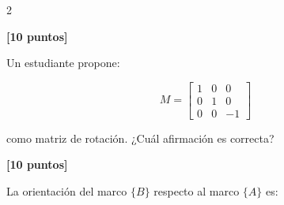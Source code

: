 \documentclass[10pt]{article}
\begin{document}
\begin{multicols}{2}

        \begin{question}
            \textbf{[10 puntos]}

            Un estudiante propone:

            \[
            M=
            \begin{bmatrix}
                1 & 0 & 0\\
                0 & 1 & 0\\
                0 & 0 & -1
            \end{bmatrix}
            \]

            como matriz de rotación.
            \columnbreak
            ¿Cuál afirmación es correcta?

            \begin{answers}



            \end{answers}
        \end{question}




        \begin{question}
            \textbf{[10 puntos]}

            La orientación del marco \(\{B\}\) respecto al marco \(\{A\}\) es:


\end{question}
\end{multicols}
\end{document}
